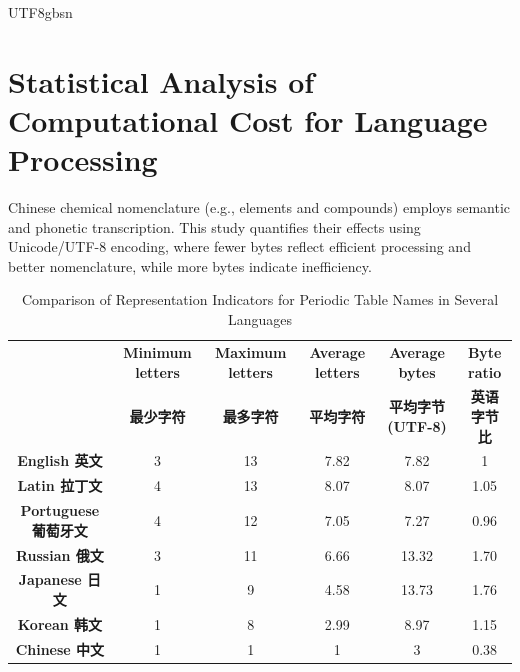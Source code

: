 \documentclass[conference]{IEEEtran}
\begin{document}
\begin{CJK*}{UTF8}{gbsn}


\section{Statistical Analysis of Computational Cost for Language Processing}

Chinese chemical nomenclature (e.g., elements and compounds) employs semantic and phonetic transcription. This study quantifies their effects using Unicode/UTF-8 encoding, where fewer bytes reflect efficient processing and better nomenclature, while more bytes indicate inefficiency.

\begin{table}[h!]
\centering
\caption{Comparison of Representation Indicators for Periodic Table Names in Several Languages}
\begin{tabular}{cccccc}
\hline
 & \textbf{Minimum letters} & \textbf{Maximum letters} & \textbf{Average letters} & \textbf{Average bytes} & \textbf{Byte ratio} \\ 
 & \textbf{最少字符} & \textbf{最多字符} & \textbf{平均字符} & \textbf{平均字节(UTF-8)} & \textbf{英语字节比} \\ \hline
\textbf{English 英文} & 3 & 13 & 7.82 & 7.82 & 1 \\ 
\textbf{Latin 拉丁文} & 4 & 13 & 8.07 & 8.07 & 1.05 \\ 
\textbf{Portuguese 葡萄牙文} & 4 & 12 & 7.05 & 7.27 & 0.96 \\ 
\textbf{Russian 俄文} & 3 & 11 & 6.66 & 13.32 & 1.70 \\ 
\textbf{Japanese 日文} & 1 & 9 & 4.58 & 13.73 & 1.76 \\ 
\textbf{Korean 韩文} & 1 & 8 & 2.99 & 8.97 & 1.15 \\ 
\textbf{Chinese 中文} & 1 & 1 & 1 & 3 & 0.38 \\ \hline
\end{tabular}
\label{tab:letter_byte_comparison}
\end{table}


\end{CJK*}
\end{document}
